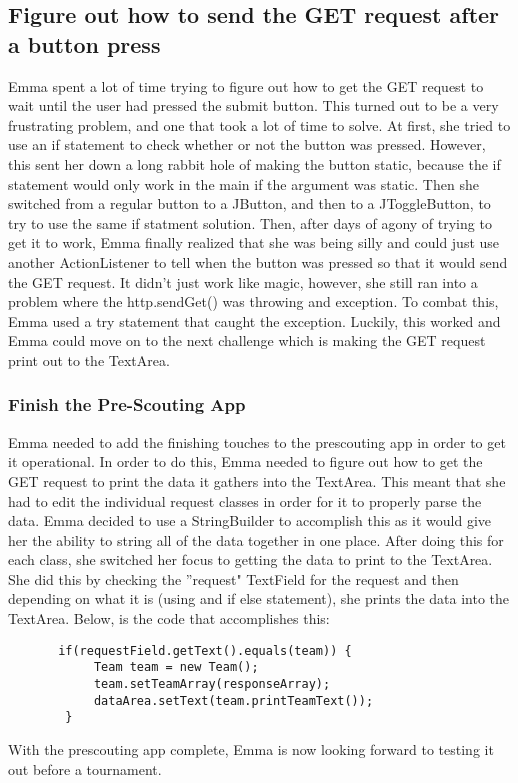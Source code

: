 \documentclass{article}
\begin{document}
\subsection{Figure out how to send the GET request after a button press}
Emma spent a lot of time trying to figure out how to get the GET request to wait until the user had pressed the submit button. This turned out to be a very frustrating problem, and one that took a lot of time to solve. At first, she tried to use an if statement to check whether or not the button was pressed. However, this sent her down a long rabbit hole of making the button static, because the if statement would only work in the main if the argument was static. Then she switched from a regular button to a JButton, and then to a JToggleButton, to try to use the same if statment solution. Then, after days of agony of trying to get it to work, Emma finally realized that she was being silly and could just use another ActionListener to tell when the button was pressed so that it would send the GET request. It didn't just work like magic, however, she still ran into a problem where the http.sendGet() was throwing and exception. To combat this, Emma used a try statement that caught the exception. Luckily, this worked and Emma could move on to the next challenge which is making the GET request print out to the TextArea.

\subsubsection{Finish the Pre-Scouting App}
Emma needed to add the finishing touches to the prescouting app in order to get it operational. In order to do this, Emma needed to figure out how to get the GET request to print the data it gathers into the TextArea. This meant that she had to edit the individual request classes in order for it to properly parse the data. Emma decided to use a StringBuilder to accomplish this as it would give her the ability to string all of the data together in one place. After doing this for each class, she switched her focus to getting the data to print to the TextArea. She did this by checking the ''request" TextField for the request and then depending on what it is (using and if else statement), she prints the data into the TextArea. Below, is the code that accomplishes this: \\

\begin{lstlisting}
       if(requestField.getText().equals(team)) {
            Team team = new Team();
            team.setTeamArray(responseArray);
            dataArea.setText(team.printTeamText());
        } 
\end{lstlisting}

With the prescouting app complete, Emma is now looking forward to testing it out before a tournament. 
\end{document}
